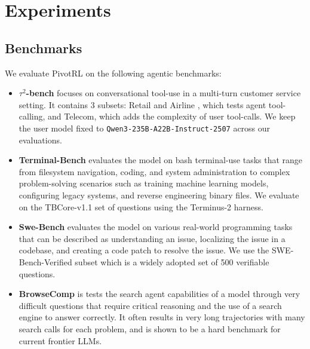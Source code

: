 \section{Experiments}
\label{sec:experiments}

\subsection{Benchmarks}
We evaluate PivotRL on the following agentic benchmarks:
\begin{itemize}
  \item \textbf{$\tau^2$-bench} \citep{barres2025tau2bench} focuses on conversational tool-use in a multi-turn customer service setting. It contains 3 subsets: Retail and Airline \citep{yao2024taubench}, which tests agent tool-calling, and Telecom, which adds the complexity of user tool-calls. We keep the user model fixed to \texttt{Qwen3-235B-A22B-Instruct-2507} across our evaluations.
  \item \textbf{Terminal-Bench} \citep{tbench_2025} evaluates the model on bash terminal-use tasks that range from filesystem navigation, coding, and system administration to complex problem-solving scenarios such as training machine learning models, configuring legacy systems, and reverse engineering binary files. We evaluate on the TBCore-v1.1 set of questions using the Terminus-2 harness.
  \item \textbf{Swe-Bench} \citep{jimenez2024swebench} evaluates the model on various real-world programming tasks that can be described as understanding an issue, localizing the issue in a codebase, and creating a code patch to resolve the issue. We use the SWE-Bench-Verified subset which is a widely adopted set of 500 verifiable questions.
  \item \textbf{BrowseComp}
  \citep{wei2025browsecompsimplechallengingbenchmark} is tests the search agent capabilities of a model through very difficult questions that require critical reasoning and the use of a search engine to answer correctly. It often results in very long trajectories with many search calls for each problem, and is shown to be a hard benchmark for current frontier LLMs.
\end{itemize}

